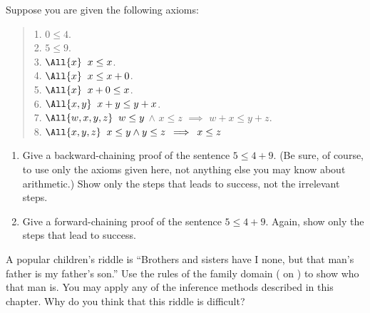 \begin{iexercise}
Suppose you are given the following axioms:
\begin{quote}
1. $0 \leq 4$. \\
2. $5 \leq 9$. \\
3. $\All{x} \; \; x \leq x$. \\
4. $\All{x} \; \; x \leq x+0$. \\
5. $\All{x} \; \; x+0 \leq x$. \\
6. $\All{x,y} \; \; x+y \leq y+x$. \\
7. $\All {w,x,y,z} \; \; w \leq y$ $\wedge$ $x \leq z$ $\implies$ $w+x \leq y+z$.
\\
8. $\All{x,y,z} \; \; x \leq y \wedge y \leq z \: \implies \: x \leq z$
\end{quote}
\begin{enumerate}
\item Give a backward-chaining proof of the sentence $5 \leq 4+9$.
(Be sure, of course, to use only the axioms given here, not anything else
you may know about arithmetic.)  Show only the steps that leads to success,
not the irrelevant steps.
\item Give a forward-chaining proof of the sentence $5 \leq 4+9$.
Again, show only the steps that lead to success.\end{enumerate}
\end{iexercise} 

\begin{exercise}
A popular children's riddle is ``Brothers and sisters have I none, but
that man's father is my father's son.''  Use the rules of the family
domain ( on ) to show who that man is.  You may apply
any of the inference methods described in this chapter. Why do you think
that this riddle is difficult?
\end{exercise} 



